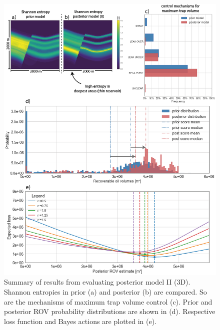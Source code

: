 \documentclass[a4paper,11pt]{MScThesis}
\begin{document}
    \begin{figure}[p!]
    	\centering
    	\includegraphics[width=1\textwidth]{Figures/Appendix/ML3}
    	\caption{Summary of results from evaluating posterior model II (3D). Shannon entropies in prior (a) and posterior (b) are compared. So are the mechanisms of maximum trap volume control (c). Prior and posterior ROV probability distributions are shown in (d). Respective loss function and Bayes actions are plotted in (e).}\label{fig:ML3}
    \end{figure}



    \printindex
    \cleardoublepage
\end{document}
